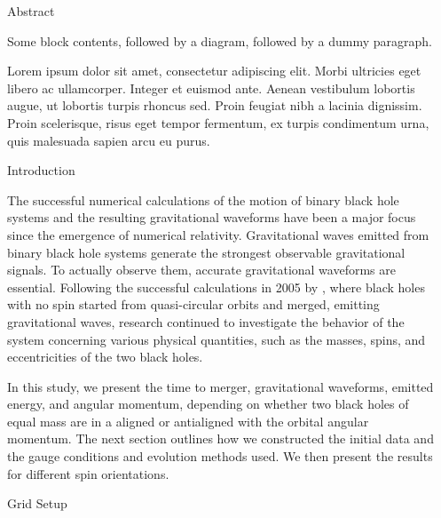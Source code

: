 \documentclass[noamssymb]{beamer}
\newlength{\sepwidth}
\newlength{\colwidth}
\newcommand{\separatorcolumn}{\begin{column}{\sepwidth}\end{column}}
\begin{document}
\begin{frame}[t]
\begin{columns}[t]
\separatorcolumn

\begin{column}{\colwidth}

  \begin{block}{Abstract}

    Some block contents, followed by a diagram, followed by a dummy paragraph.

    Lorem ipsum dolor sit amet, consectetur adipiscing elit. Morbi ultricies
    eget libero ac ullamcorper. Integer et euismod ante. Aenean vestibulum
    lobortis augue, ut lobortis turpis rhoncus sed. Proin feugiat nibh a
    lacinia dignissim. Proin scelerisque, risus eget tempor fermentum, ex
    turpis condimentum urna, quis malesuada sapien arcu eu purus. 

  \end{block}
  
  \begin{block}{Introduction}
  	
  	The successful numerical calculations of the motion of binary black hole systems and the resulting gravitational waveforms have been a major focus since the emergence of numerical relativity. Gravitational waves emitted from binary black hole systems generate the strongest observable gravitational signals. To actually observe them, accurate gravitational waveforms are essential. Following the successful calculations in 2005 by \cite{Campanelli:2005dd, Baker:2005vv, Pretorius:2005gq}, where black holes with no spin started from quasi-circular orbits and merged, emitting gravitational waves, research continued to investigate the behavior of the system concerning various physical quantities, such as the masses, spins, and eccentricities of the two black holes.
  	
  	In this study, we present the time to merger, gravitational waveforms, emitted energy, and angular momentum, depending on whether two black holes of equal mass are in a aligned or antialigned with the orbital angular momentum. The next section outlines how we constructed the initial data and the gauge conditions and evolution methods used. We then present the results for different spin orientations.
  	
  \end{block}
  
  \begin{block}{Grid Setup}
  	

\end{block}
\end{column}
\end{columns}
\end{frame}
\end{document}
